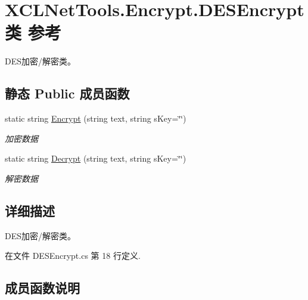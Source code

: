 \hypertarget{class_x_c_l_net_tools_1_1_encrypt_1_1_d_e_s_encrypt}{}\section{X\+C\+L\+Net\+Tools.\+Encrypt.\+D\+E\+S\+Encrypt类 参考}
\label{class_x_c_l_net_tools_1_1_encrypt_1_1_d_e_s_encrypt}


D\+E\+S加密/解密类。  


\subsection*{静态 Public 成员函数}
\begin{DoxyCompactItemize}
\item 
static string \hyperlink{class_x_c_l_net_tools_1_1_encrypt_1_1_d_e_s_encrypt_a5bd946e26e2f43cc6b2d999df6b9d88d}{Encrypt} (string text, string s\+Key=\char`\"{}\char`\"{})
\begin{DoxyCompactList}\small\item\em 加密数据 \end{DoxyCompactList}\item 
static string \hyperlink{class_x_c_l_net_tools_1_1_encrypt_1_1_d_e_s_encrypt_a2455ab42f563bee03bf39c6f6eb9b2d1}{Decrypt} (string text, string s\+Key=\char`\"{}\char`\"{})
\begin{DoxyCompactList}\small\item\em 解密数据 \end{DoxyCompactList}\end{DoxyCompactItemize}


\subsection{详细描述}
D\+E\+S加密/解密类。 



在文件 D\+E\+S\+Encrypt.\+cs 第 18 行定义.



\subsection{成员函数说明}
\mbox{\label{class_x_c_l_net_tools_1_1_encrypt_1_1_d_e_s_encrypt_a2455ab42f563bee03bf39c6f6eb9b2d1}} 
